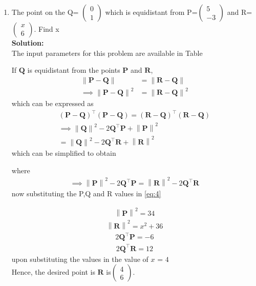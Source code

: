 \documentclass[12pt]{article}
\providecommand{\brak}[1]{\ensuremath{\left(#1\right)}}
\providecommand{\norm}[1]{\left\lVert#1\right\rVert}
\newcommand{\solution}{\noindent \textbf{Solution: }}
\newcommand{\myvec}[1]{\ensuremath{\begin{pmatrix}#1\end{pmatrix}}}
\let\vec\mathbf
\begin{document}
\begin{enumerate}

\item The point on the Q= $\myvec{0\\ 1}$ which is equidistant from P=$\myvec{5 \\ -3}$ and R=$\myvec{x\\6}$. Find x\\

\solution \\The input parameters for this problem are available in Table 
\begin{table}[ht!]

\caption{}
\label{Table-1}	
\end{table}


  If $\vec{Q}$  is  equidistant from the points $\vec{P}$ and $\vec{R}$, 
\begin{align}
 \norm{\vec{P}-\vec{Q}} &=
\norm{\vec{R}-\vec{Q}} 
\\
 \implies \norm{\vec{P}-\vec{Q}}^2 &=
\norm{\vec{R}-\vec{Q}}^2 
\end{align}
which can be expressed as 
\begin{multline}
 \brak{\vec{P}-\vec{Q}}^{\top} \brak{\vec{P}-\vec{Q}}=
 \brak{\vec{R}-\vec{Q}}^{\top} 
\brak{\vec{R}-\vec{Q}}
\\
 \implies \norm{\vec{Q}}^2-2{\vec{Q}}^{\top}\vec{P} + \norm{\vec{P}}^2
 \\= \norm{\vec{Q}}^2-2{\vec{Q}}^{\top}\vec{R} + \norm{\vec{R}}^2
\end{multline}
which can be simplified to obtain
  
  where 
  \begin{align}
   \implies \norm{\vec{P}}^2-2{\vec{Q}}^{\top}\vec{P} = \norm{\vec{R}}^2-2{\vec{Q}}^{\top}\vec{R} 
\label{eq:4} 
  \end{align}
  now substituting the P,Q and R values in \eqref{eq:4}

  \begin{align}
   \norm{\vec{P}}^2 = 34
    \end{align}
 \begin{align}
   \norm{\vec{R}}^2 = x^2+36
    \end{align}
  \begin{align}
 2{\vec{Q}}^{\top}\vec{P}= -6
\end{align}
\begin{align}
 2{\vec{Q}}^{\top}\vec{R}= 12
\end{align}
upon   substituting the values in  the value of $x$ = $ 4$
\\Hence, the desired point is $\vec{R}$ is$\myvec{ 4 \\ 6}$.




\end{enumerate}
\end{document}
